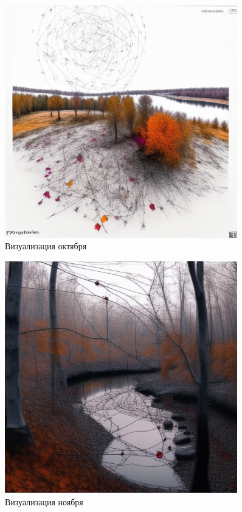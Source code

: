 \begin{figure}[H]
	\caption{Визуализация октября}
	\includegraphics[width=0.9\textwidth]{img/oct.jpeg}
\end{figure}

\begin{figure}[H]
	\caption{Визуализация ноября}
	\includegraphics[width=0.9\textwidth]{img/nov.jpeg}
\end{figure}

